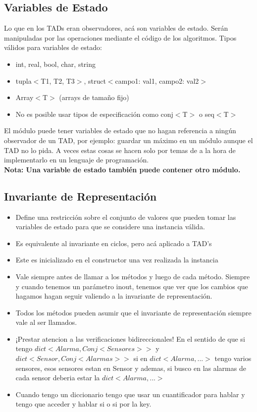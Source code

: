 \documentclass[10pt,a4paper]{article}
\begin{document}
\subsection*{Variables de Estado}
Lo que en los TADs eran observadores, acá son variables de estado. Serán manipuladas por las operaciones mediante el código de los algoritmos. 
Tipos válidos para variables de estado: 
\begin{itemize}
    \item int, real, bool, char, string
    \item tupla\(<\)T1, T2, T3\(>\), struct\(<\)campo1: val1, campo2: val2\(>\)
    \item Array\(<\)T\(>\) (arrays de tamaño fijo)
    \item No es posible usar tipos de especificación como conj\(<\)T\(>\) o seq\(<\)T\(>\)
\end{itemize}
El módulo puede tener variables de estado que no hagan referencia a ningún observador de un TAD, por ejemplo: guardar un máximo en un módulo aunque el TAD no lo pida. A veces estas cosas se hacen solo por temas de a la hora de implementarlo en un lenguaje de programación. \\ 
\textbf{Nota: Una variable de estado también puede contener otro módulo.}
\subsection*{Invariante de Representación}
\begin{itemize}
    \item Define una restricción sobre el conjunto de valores que pueden tomar las variables de estado para que se considere una instancia válida.
    \item Es equivalente al invariante en ciclos, pero acá aplicado a TAD's
    \item Este es inicializado en el constructor una vez realizada la instancia
    \item Vale siempre antes de llamar a los métodos y luego de cada método. Siempre y cuando tenemos un parámetro inout, tenemos que ver que los cambios que hagamos hagan seguir valiendo a la invariante de representación.
    \item Todos los métodos pueden asumir que el invariante de representación siempre vale al ser llamados.
    \item ¡Prestar atencion a las verificaciones bidireccionales! En el sentido de que si tengo \(dict<Alarma, Conj<Sensores>>\) y \(dict<Sensor, Conj<Alarmas>>\) si en \(dict<Alarma, ...>\) tengo varios sensores, esos sensores estan en Sensor y ademas, si busco en las alarmas de cada sensor deberia estar la \(dict<Alarma, ...>\)
    \item Cuando tengo un diccionario tengo que usar un cuantificador para hablar y tengo que acceder y hablar si o si por la key.
\end{itemize}
\end{document}
